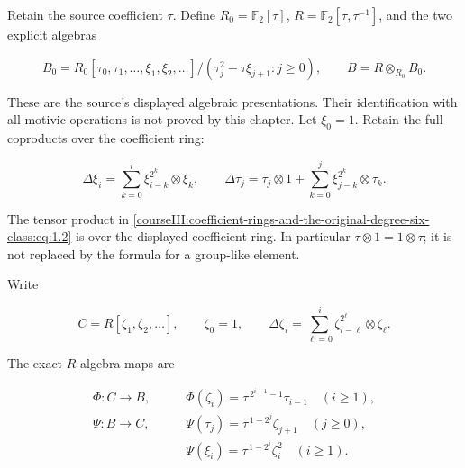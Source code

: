 Retain the source coefficient \(\tau\). Define \(R_0=\mathbb F_2[\tau]\), \(R=\mathbb F_2[\tau,\tau^{-1}]\), and the two explicit algebras

\begin{equation}
B_0=R_0[\tau_0,\tau_1,\ldots,\xi_1,\xi_2,\ldots]/
                    (\tau_j^2-\tau\xi_{j+1}:j\geq0),\qquad
 B=R\otimes_{R_0}B_0.
 \label{courseIII:coefficient-rings-and-the-original-degree-six-class:eq:1.1}
\end{equation}

These are the source's displayed algebraic presentations. Their identification with all motivic operations is not proved by this chapter. Let \(\xi_0=1\). Retain the full coproducts over the coefficient ring:

\begin{equation}
\Delta\xi_i=\sum_{k=0}^{i}\xi_{i-k}^{2^k}\otimes\xi_k,\qquad
 \Delta\tau_j=\tau_j\otimes1+
                   \sum_{k=0}^{j}\xi_{j-k}^{2^k}\otimes\tau_k.
 \label{courseIII:coefficient-rings-and-the-original-degree-six-class:eq:1.2}
\end{equation}

The tensor product in \eqref{courseIII:coefficient-rings-and-the-original-degree-six-class:eq:1.2} is over the displayed coefficient ring. In particular \(\tau\otimes1=1\otimes\tau\); it is not replaced by the formula for a group-like element.

Write

\begin{equation}
C=R[\zeta_1,\zeta_2,\ldots],\qquad \zeta_0=1,\qquad
 \Delta\zeta_i=\sum_{\ell=0}^{i}
                     \zeta_{i-\ell}^{2^\ell}\otimes\zeta_\ell .
 \label{courseIII:coefficient-rings-and-the-original-degree-six-class:eq:1.3}
\end{equation}

The exact \(R\)-algebra maps are

\begin{equation}
\begin{aligned}
 \Phi:C\longrightarrow B,\qquad
       &\Phi(\zeta_i)=\tau^{\,2^{i-1}-1}\tau_{i-1}\quad(i\geq1),\\
 \Psi:B\longrightarrow C,\qquad
       &\Psi(\tau_j)=\tau^{\,1-2^j}\zeta_{j+1}\quad(j\geq0),\\
       &\Psi(\xi_i)=\tau^{\,1-2^i}\zeta_i^2\quad(i\geq1).
 \end{aligned}
 \label{courseIII:coefficient-rings-and-the-original-degree-six-class:eq:1.4}
\end{equation}

